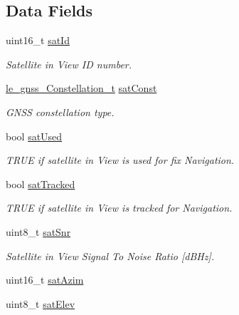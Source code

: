 \subsection*{Data Fields}
\begin{DoxyCompactItemize}
\item 
uint16\+\_\+t \hyperlink{struct_pa___gnss___sv_info__t_ac337f3f1263f515bdc8f3abeaa155475}{sat\+Id}
\begin{DoxyCompactList}\small\item\em Satellite in View ID number. \end{DoxyCompactList}\item 
\hyperlink{le__gnss__interface_8h_a30697e968cedd1935e7ca5f3ebe2fea9}{le\+\_\+gnss\+\_\+\+Constellation\+\_\+t} \hyperlink{struct_pa___gnss___sv_info__t_a8f5881bb6dbcf7aeab1e190f0a4287b0}{sat\+Const}
\begin{DoxyCompactList}\small\item\em G\+N\+SS constellation type. \end{DoxyCompactList}\item 
bool \hyperlink{struct_pa___gnss___sv_info__t_a3ee7b02010364f4ceaabf4d9985d338e}{sat\+Used}
\begin{DoxyCompactList}\small\item\em T\+R\+UE if satellite in View is used for fix Navigation. \end{DoxyCompactList}\item 
bool \hyperlink{struct_pa___gnss___sv_info__t_aa2e4449c451f5748c4138415e965fbd6}{sat\+Tracked}
\begin{DoxyCompactList}\small\item\em T\+R\+UE if satellite in View is tracked for Navigation. \end{DoxyCompactList}\item 
uint8\+\_\+t \hyperlink{struct_pa___gnss___sv_info__t_a50c5f81a8a9beccf5481f670773ff40c}{sat\+Snr}
\begin{DoxyCompactList}\small\item\em Satellite in View Signal To Noise Ratio \mbox{[}d\+B\+Hz\mbox{]}. \end{DoxyCompactList}\item 
uint16\+\_\+t \hyperlink{struct_pa___gnss___sv_info__t_a6e9f58fd59caf4955ba0b27683d38f52}{sat\+Azim}
\item 
uint8\+\_\+t \hyperlink{struct_pa___gnss___sv_info__t_a6075b59d5abb744106c601290e7c3e10}{sat\+Elev}
\end{DoxyCompactItemize}


